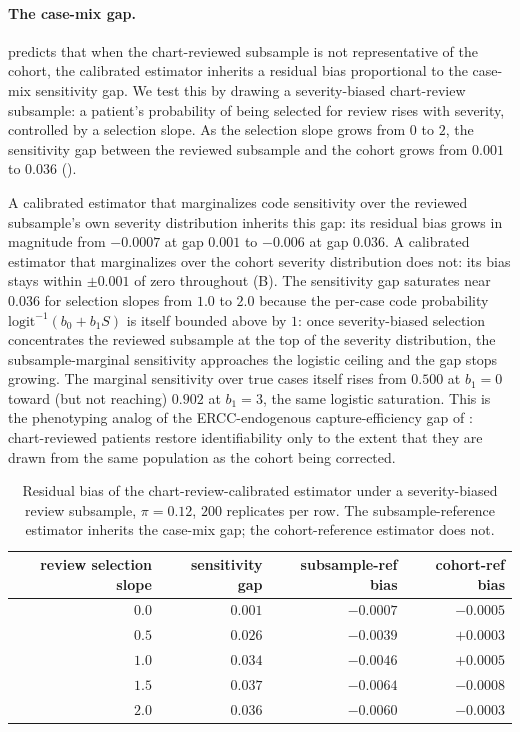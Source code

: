 \paragraph{The case-mix gap.}  predicts that when the
chart-reviewed subsample is not representative of the cohort, the
calibrated estimator inherits a residual bias proportional to the
case-mix sensitivity gap. We test this by drawing a severity-biased
chart-review subsample: a patient's probability of being selected for
review rises with severity, controlled by a selection slope. As the
selection slope grows from $0$ to $2$, the sensitivity gap between the
reviewed subsample and the cohort grows from $0.001$ to $0.036$
().

A calibrated estimator that marginalizes code sensitivity over the
reviewed subsample's own severity distribution inherits this gap: its
residual bias grows in magnitude from $-0.0007$ at gap $0.001$ to
$-0.006$ at gap $0.036$. A calibrated estimator that marginalizes over
the cohort severity distribution does not: its bias stays within
$\pm 0.001$ of zero throughout (B). The
sensitivity gap saturates near $0.036$ for selection slopes from $1.0$
to $2.0$ because the per-case code probability $\mathrm{logit}^{-1}(b_0
+ b_1 S)$ is itself bounded above by $1$: once severity-biased
selection concentrates the reviewed subsample at the top of the
severity distribution, the subsample-marginal sensitivity approaches
the logistic ceiling and the gap stops growing. The marginal
sensitivity over true cases itself rises from $0.500$ at $b_1 = 0$
toward (but not reaching) $0.902$ at $b_1 = 3$, the same logistic
saturation. This is the phenotyping analog of the ERCC-endogenous
capture-efficiency gap of \citet{towell2026scrnacoarsening}:
chart-reviewed patients restore identifiability only to the extent
that they are drawn from the same population as the cohort being
corrected.

\begin{table}[ht]
\centering
\begin{tabular}{rrrr}
\toprule
review selection slope & sensitivity gap & subsample-ref bias & cohort-ref bias \\
\midrule
$0.0$ & $0.001$ & $-0.0007$ & $-0.0005$ \\
$0.5$ & $0.026$ & $-0.0039$ & $+0.0003$ \\
$1.0$ & $0.034$ & $-0.0046$ & $+0.0005$ \\
$1.5$ & $0.037$ & $-0.0064$ & $-0.0008$ \\
$2.0$ & $0.036$ & $-0.0060$ & $-0.0003$ \\
\bottomrule
\end{tabular}
\caption{Residual bias of the chart-review-calibrated estimator under
a severity-biased review subsample, $\pi = 0.12$, $200$ replicates per
row. The subsample-reference estimator inherits the case-mix gap; the
cohort-reference estimator does not.}
\label{tab:casemix}
\end{table}

